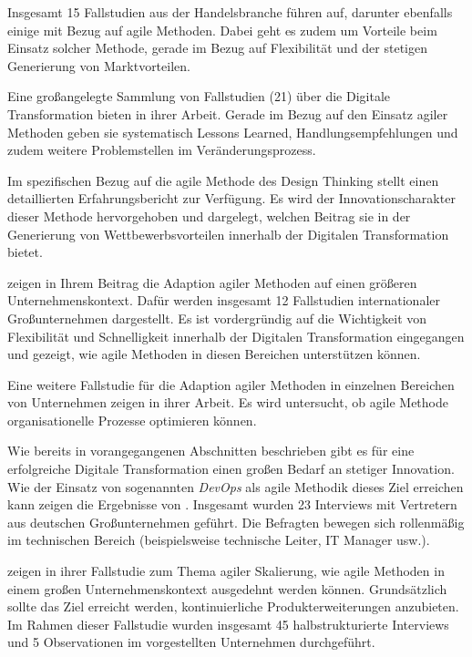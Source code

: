 Insgesamt 15 Fallstudien aus der Handelsbranche führen  auf, darunter ebenfalls einige mit Bezug auf agile Methoden. Dabei geht es zudem um Vorteile beim Einsatz solcher Methode, gerade im Bezug auf Flexibilität und der stetigen Generierung von Marktvorteilen.

Eine großangelegte Sammlung von Fallstudien (21) über die Digitale Transformation bieten  in ihrer Arbeit. Gerade im Bezug auf den Einsatz agiler Methoden geben sie systematisch Lessons Learned, Handlungsempfehlungen und zudem weitere Problemstellen im Veränderungsprozess.

Im spezifischen Bezug auf die agile Methode des Design Thinking stellt  einen detaillierten Erfahrungsbericht zur Verfügung. Es wird der Innovationscharakter  dieser Methode hervorgehoben und dargelegt, welchen Beitrag sie in der Generierung von Wettbewerbsvorteilen innerhalb der Digitalen Transformation bietet.

 zeigen in Ihrem Beitrag die Adaption agiler Methoden auf einen größeren Unternehmenskontext. Dafür werden insgesamt 12 Fallstudien internationaler Großunternehmen dargestellt. Es ist vordergründig auf die Wichtigkeit von Flexibilität und Schnelligkeit innerhalb der Digitalen Transformation eingegangen und gezeigt, wie agile Methoden in diesen Bereichen unterstützen können.

Eine weitere Fallstudie für die Adaption agiler Methoden in einzelnen Bereichen von Unternehmen zeigen  in ihrer Arbeit. Es wird untersucht, ob agile Methode organisationelle Prozesse optimieren können.

Wie bereits in vorangegangenen Abschnitten beschrieben gibt es für eine erfolgreiche Digitale Transformation einen großen Bedarf an stetiger Innovation. Wie der Einsatz von sogenannten \textit{DevOps} als agile Methodik dieses Ziel erreichen kann zeigen die Ergebnisse von . Insgesamt wurden 23 Interviews mit Vertretern aus deutschen Großunternehmen geführt. Die Befragten bewegen sich rollenmäßig im technischen Bereich (beispielsweise technische Leiter, IT Manager usw.).

 zeigen in ihrer Fallstudie zum Thema agiler Skalierung, wie agile Methoden in einem großen Unternehmenskontext ausgedehnt werden können. Grundsätzlich sollte das Ziel erreicht werden, kontinuierliche Produkterweiterungen anzubieten. Im Rahmen dieser Fallstudie wurden insgesamt 45 halbstrukturierte Interviews  und 5 Observationen im vorgestellten Unternehmen durchgeführt.

